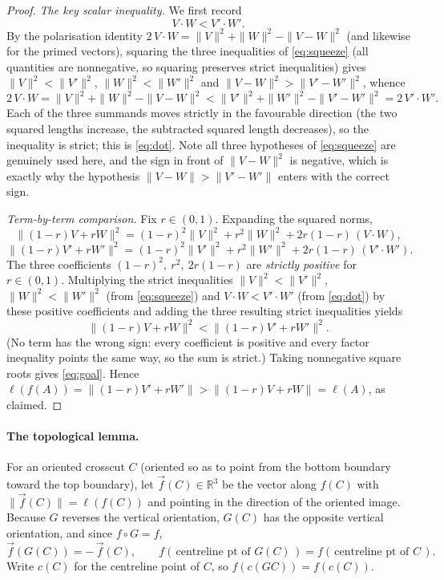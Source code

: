 \documentclass[12pt]{article}
\newcommand{\R}{\mathbb{R}}
\begin{document}
\begin{proof}
\smallskip
\emph{The key scalar inequality.} We first record
\begin{equation}\label{eq:dot}
V\!\cdot\!W<V'\!\cdot\!W'.
\end{equation}
By the polarisation identity $2\,V\!\cdot\!W=\|V\|^2+\|W\|^2-\|V-W\|^2$
(and likewise for the primed vectors), squaring the three inequalities of
\eqref{eq:squeeze} (all quantities are nonnegative, so squaring preserves
strict inequalities) gives $\|V\|^2<\|V'\|^2$, $\|W\|^2<\|W'\|^2$ and
$\|V-W\|^2>\|V'-W'\|^2$, whence
\[
2\,V\!\cdot\!W=\|V\|^2+\|W\|^2-\|V-W\|^2
<\|V'\|^2+\|W'\|^2-\|V'-W'\|^2=2\,V'\!\cdot\!W'.
\]
Each of the three summands moves strictly in the favourable direction
(the two squared lengths increase, the subtracted squared length
decreases), so the inequality is strict; this is \eqref{eq:dot}. Note all
three hypotheses of \eqref{eq:squeeze} are genuinely used here, and the
sign in front of $\|V-W\|^2$ is negative, which is exactly why the
hypothesis $\|V-W\|>\|V'-W'\|$ enters with the correct sign.

\smallskip
\emph{Term-by-term comparison.} Fix $r\in(0,1)$. Expanding the squared
norms,
\[
\|(1-r)V+rW\|^2=(1-r)^2\|V\|^2+r^2\|W\|^2+2r(1-r)\,(V\!\cdot\!W),
\]
\[
\|(1-r)V'+rW'\|^2=(1-r)^2\|V'\|^2+r^2\|W'\|^2+2r(1-r)\,(V'\!\cdot\!W').
\]
The three coefficients $(1-r)^2,\ r^2,\ 2r(1-r)$ are \emph{strictly
positive} for $r\in(0,1)$. Multiplying the strict inequalities
$\|V\|^2<\|V'\|^2$, $\|W\|^2<\|W'\|^2$ (from \eqref{eq:squeeze}) and
$V\!\cdot\!W<V'\!\cdot\!W'$ (from \eqref{eq:dot}) by these positive
coefficients and adding the three resulting strict inequalities yields
\[
\|(1-r)V+rW\|^2<\|(1-r)V'+rW'\|^2 .
\]
(No term has the wrong sign: every coefficient is positive and every
factor inequality points the same way, so the sum is strict.) Taking
nonnegative square roots gives \eqref{eq:goal}. Hence
$\ell(f(A))=\|(1-r)V'+rW'\|>\|(1-r)V+rW\|=\ell(A)$, as claimed.
\end{proof}

\paragraph{The topological lemma.}
For an oriented crosscut $C$ (oriented so as to point from the bottom
boundary toward the top boundary), let $\overrightarrow f(C)\in\R^3$ be
the vector along $f(C)$ with $\|\overrightarrow f(C)\|=\ell(f(C))$ and
pointing in the direction of the oriented image. Because $G$ reverses the
vertical orientation, $G(C)$ has the opposite vertical orientation, and
since $f\circ G=f$,
\begin{equation}\label{eq:odd-vec}
\overrightarrow f(G(C))=-\,\overrightarrow f(C),\qquad
f(\,\text{centreline pt of }G(C)\,)=f(\,\text{centreline pt of }C\,).
\end{equation}
Write $c(C)$ for the centreline point of $C$, so $f(c(GC))=f(c(C))$.
\end{document}
